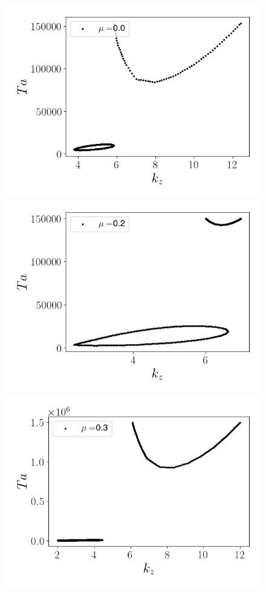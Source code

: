 \documentclass[varwidth]{standalone}
\begin{document}
\begin{figure} 
\includegraphics[scale = 0.2]{open_mu_0.0_m_-4.png}
  \includegraphics[scale = 0.2]{open_mu_0.2_m_-4.png}
\includegraphics[scale = 0.2]{open_mu_0.3_m_-4.png}
\end{figure}
\end{document}

